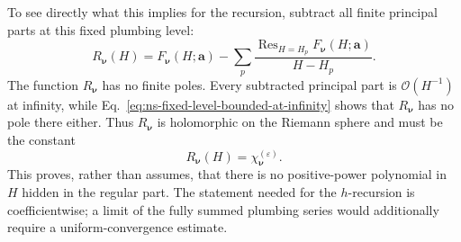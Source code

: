 \documentclass[11pt]{article}
\newcommand{\order}{\mathcal O}
\begin{document}
To see directly what this implies for the recursion, subtract all finite
principal parts at this fixed plumbing level:
\begin{equation}
 R_{\boldsymbol\nu}(H)
 =
 F_{\boldsymbol\nu}(H;\boldsymbol a)
 -
 \sum_{p}
 \frac{\operatorname{Res}_{H=H_p}
 F_{\boldsymbol\nu}(H;\boldsymbol a)}
 {H-H_p}.
 \label{eq:ns-fixed-level-pole-subtraction}
\end{equation}
The function \(R_{\boldsymbol\nu}\) has no finite poles.  Every subtracted
principal part is \(\order(H^{-1})\) at infinity, while
Eq.~\eqref{eq:ns-fixed-level-bounded-at-infinity} shows that
\(R_{\boldsymbol\nu}\) has no pole there either.  Thus
\(R_{\boldsymbol\nu}\) is holomorphic on the Riemann sphere and must be the
constant
\begin{equation}
 R_{\boldsymbol\nu}(H)
 =
 \chi^{(\varepsilon)}_{\boldsymbol\nu}.
 \label{eq:ns-fixed-level-regular-constant}
\end{equation}
This proves, rather than assumes, that there is no positive-power
polynomial in \(H\) hidden in the regular part.  The statement needed for
the \(h\)-recursion is coefficientwise; a limit of the fully summed
plumbing series would additionally require a uniform-convergence estimate.
\end{document}
